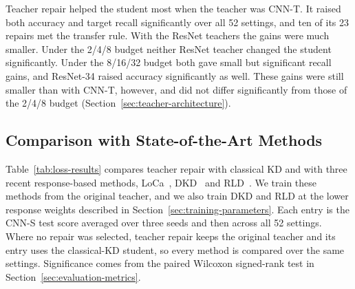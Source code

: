 \documentclass[review,number,sort&compress]{elsarticle}
\theoremstyle{definition}
\begin{document}
Teacher repair helped the student most when the teacher was CNN-T. It
raised both accuracy and target recall significantly over all 52
settings, and ten of its 23 repairs met the transfer rule. With the
ResNet teachers the gains were much smaller. Under the 2/4/8 budget
neither ResNet teacher changed the student significantly. Under the
8/16/32 budget both gave small but significant recall gains, and
ResNet-34 raised accuracy significantly as well. These gains were still
smaller than with CNN-T, however, and did not differ significantly
from those of the 2/4/8 budget
(Section~\ref{sec:teacher-architecture}).

\FloatBarrier
\subsection{Comparison with State-of-the-Art Methods}
\label{sec:sota-comparison}

Table~\ref{tab:loss-results} compares teacher repair with classical KD
and with three recent response-based methods,
LoCa~\citep{yang2024loca}, DKD~\citep{zhao2022decoupled} and
RLD~\citep{sun2025knowledge}. We train these methods from the original
teacher, and we also train DKD and RLD at the lower response weights
described in Section~\ref{sec:training-parameters}. Each entry is the
CNN-S test score averaged over three seeds and then across all 52
settings. Where no repair was selected, teacher repair keeps the
original teacher and its entry uses the classical-KD student, so every
method is compared over the same settings. Significance comes from the
paired Wilcoxon signed-rank test in
Section~\ref{sec:evaluation-metrics}.
\end{document}
